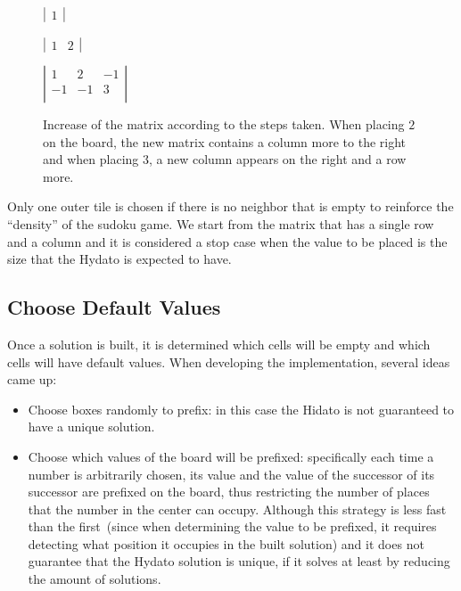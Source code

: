 \documentclass{llncs}
\begin{document}
\begin{figure}
\begin{center}
$\left| 
\begin{array}{r}
1
\end{array} 
\right|$
\end{center}

\begin{center}
$\left| 
\begin{array}{rr}
1 & 2
\end{array} 
\right|$
\end{center}

\begin{center}
$\left| 
\begin{array}{rrr}
1 & 2 & -1 \\
-1 & -1 & 3 \\
\end{array} 
\right|$
\end{center}
\caption{
	Increase of the matrix according to the steps taken. When placing $2$ on the board, the new matrix contains a column more to the right and when placing $3$, a new column appears on the right and a row more.}
\label{camino}
\end{figure}

Only one outer tile is chosen if there is no neighbor that is empty to reinforce the ``density'' of the sudoku game. We start from the matrix that has a single row and a column and it is considered a stop case when the value to be placed is the size that the Hydato is expected to have.

\subsection{Choose Default Values}
Once a solution is built, it is determined which cells will be empty and which cells will have default values. When developing the implementation, several ideas came up:

\begin{itemize}
\item Choose boxes randomly to prefix: in this case the Hidato is not guaranteed to have a unique solution.
\item Choose which values of the board will be prefixed: specifically each time a number is arbitrarily chosen, its value and the value of the successor of its successor are prefixed on the board, thus restricting the number of places that the number in the center can occupy. Although this strategy is less fast than the first~(since when determining the value to be prefixed, it requires detecting what position it occupies in the built solution) and it does not guarantee that the Hydato solution is unique, if it solves at least by reducing the amount of solutions.
\end{itemize}
\end{document}
